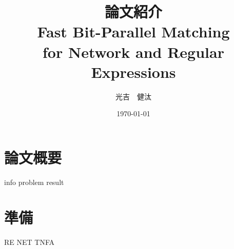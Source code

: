\documentclass[dvipdfmx,12pt,notheorems]{beamer} %
\title[略タイトル]{論文紹介\\ {\normalsize Fast Bit-Parallel Matching \\for Network and Regular Expressions}} %
\author[Mitsuyoshi]{光吉　健汰\inst{1}}
\institute[IKN]{\inst{1}北海道大学工学部 情報エレクトロニクス学科 情報理工学コース 4年\\
情報知識ネットワーク研究室}
\date{\today}%
\begin{document}
\begin{frame}
	\frametitle{}
	\titlepage
\end{frame}


\section{論文概要}
{info}
{problem}
{result}

\section{準備}
{RE}
{NET}
{TNFA}

	
\end{document}
